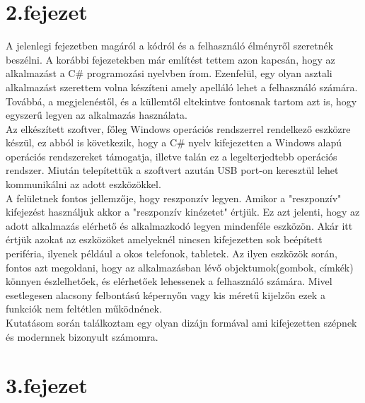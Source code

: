 \documentclass[tocnopagenum]{thesis-ekf}
\theoremstyle{definition}
\theoremstyle{remark}
\begin{document}
	\chapter*{2.fejezet}
	A jelenlegi fejezetben magáról a kódról és a felhasználó élményről szeretnék beszélni.
	A korábbi fejezetekben már említést tettem azon kapcsán, hogy az alkalmazást a C\# programozási nyelvben írom. Ezenfelül, egy olyan asztali alkalmazást szerettem volna készíteni amely apelláló lehet a felhasználó számára. Továbbá, a megjelenéstől, és a küllemtől eltekintve fontosnak tartom azt is, hogy egyszerű legyen az alkalmazás használata.
	\\
	Az elkészített szoftver, főleg Windows operációs rendszerrel rendelkező eszközre készül, ez abból is következik, hogy a C\# nyelv kifejezetten a Windows alapú operációs rendszereket támogatja, illetve talán ez a legelterjedtebb operációs rendszer.
	Miután telepítettük a szoftvert azután USB port-on keresztül lehet kommunikálni az adott eszközökkel.
	\\
	A felületnek fontos jellemzője, hogy reszponzív legyen. Amikor a "reszponzív" kifejezést használjuk akkor a "reszponzív kinézetet" értjük. Ez azt jelenti, hogy az adott alkalmazás elérhető és alkalmazkodó legyen mindenféle eszközön. Akár itt értjük azokat az eszközöket amelyeknél nincsen kifejezetten sok beépített periféria, ilyenek például a okos telefonok, tabletek. Az ilyen eszközök során, fontos azt megoldani, hogy az alkalmazásban lévő objektumok(gombok, címkék) könnyen észlelhetőek, és elérhetőek lehessenek a felhasználó számára. 
	Mivel esetlegesen alacsony felbontású képernyőn vagy kis méretű kijelzőn ezek a funkciók nem feltétlen működnének. 
	\\
	Kutatásom során találkoztam egy olyan dizájn formával ami kifejezetten szépnek és modernnek bizonyult számomra.\cite{modernUI} 

	\chapter*{3.fejezet}

\end{document}
